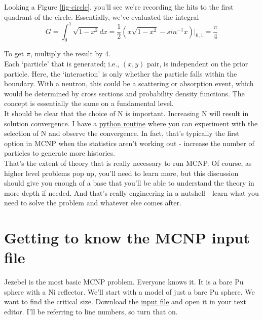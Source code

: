 \documentclass[11pt,a4paper]{article}
\begin{document}
\noindent Looking a Figure \ref{fig-circle}, you'll see we're recording the hits to the first quadrant of the circle. Essentially, we've evaluated the integral - 
\begin{equation}
    G = \int_0^1 \sqrt{1-x^2} dx = \frac{1}{2}(x\sqrt{1-x^2} - sin^{-1}x)|_{0,1} = \frac{\pi}{4}
\end{equation}

\noindent To get $\pi$, multiply the result by 4.\\

\noindent Each `particle' that is generated; i.e., $(x,y)$ pair, is independent on the prior particle. Here, the `interaction' is only whether the particle falls within the boundary. With a neutron, this could be a scattering or absorption event, which would be determined by cross sections and probability density functions. The concept is essentially the same on a fundamental level. \\

\noindent It should be clear that the choice of N is important. Increasing N will result in solution convergence. I have a \href{https://github.com/TheDoctorRAB/education/blob/master/src/monte.carlo.simple.py}{python routine} where you can experiment with the selection of N and observe the convergence. In fact, that's typically the first option in MCNP when the statistics aren't working out - increase the number of particles to generate more histories. \\

\noindent That's the extent of theory that is really necessary to run MCNP. Of course, as higher level problems pop up, you'll need to learn more, but this discussion should give you enough of a base that you'll be able to understand the theory in more depth if needed. And that's really engineering in a nutshell - learn what you need to solve the problem and whatever else comes after. 

\newpage


\section{Getting to know the MCNP input file}
\noindent Jezebel is the most basic MCNP problem. Everyone knows it. It is a bare Pu sphere with a Ni reflector. We'll start with a model of just a bare Pu sphere. We want to find the critical size. Download the \href{https://github.com/TheDoctorRAB/mcnpx.decks/blob/master/criticality/jezebel-light.inp}{input file} and open it in your text editor. I'll be referring to line numbers, so turn that on. \\
\end{document}
